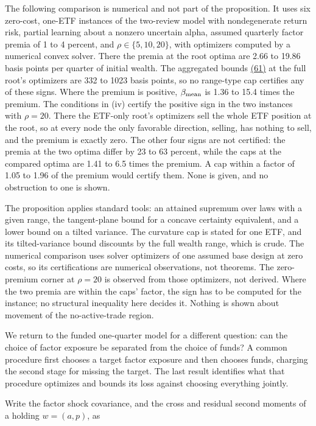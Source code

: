 \documentclass[11pt]{article}
\begin{document}
The following comparison is numerical and not part of the
proposition. It uses six zero-cost, one-ETF instances of the
two-review model with nondegenerate return risk, partial learning
about a nonzero uncertain alpha, assumed quarterly factor premia
of 1 to 4 percent, and \(\rho\in\{5,10,20\}\), with optimizers
computed by a numerical convex solver. There the premia at the
root optima are 2.66 to 19.86 basis points per quarter of
initial wealth. The aggregated bounds \hyperref[eq:61]{(61)} at the full root's
optimizers are 332 to 1023 basis points, so no range-type cap
certifies any of these signs. Where the premium is positive,
\(\beta_{\rm mean}\) is 1.36 to 15.4 times the premium. The
conditions in (iv) certify the positive sign in the two
instances with \(\rho=20\). There the ETF-only root's optimizers
sell the whole ETF position at the root, so at every node the
only favorable direction, selling, has nothing to sell, and the
premium is exactly zero. The other four signs are not certified:
the premia at the two optima differ by 23 to 63 percent, while
the caps at the compared optima are 1.41 to 6.5 times the
premium. A cap within a factor of 1.05 to 1.96 of the premium
would certify them. None is given, and no obstruction to one is
shown.

The proposition applies standard tools: an attained supremum
over laws with a given range, the tangent-plane bound for a
concave certainty equivalent, and a lower bound on a tilted
variance. The curvature cap is stated for one ETF, and its
tilted-variance bound discounts by the full wealth range, which
is crude. The numerical comparison uses solver optimizers of one
assumed base design at zero costs, so its certifications are
numerical observations, not theorems. The zero-premium corner at
\(\rho=20\) is observed from those optimizers, not derived.
Where the two premia are within the caps' factor, the sign has
to be computed for the instance; no structural inequality here
decides it. Nothing is shown about movement of the
no-active-trade region.

We return to the funded one-quarter model for a different
question: can the choice of factor exposure be separated from the
choice of funds? A common procedure first chooses a target factor
exposure and then chooses funds, charging the second stage for
missing the target. The last result identifies what that procedure
optimizes and bounds its loss against choosing everything jointly.

Write the factor shock covariance, and the cross and residual
second moments of a holding \(w=(a,p)\), as
\end{document}
